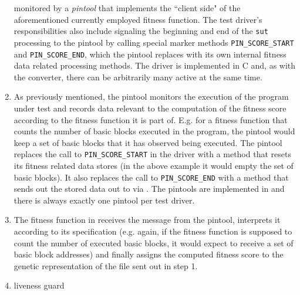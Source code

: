 \begin{enumerate}
  monitored by a \emph{pintool} that implements the ``client side" of the aforementioned currently 
  employed fitness function. The test driver's responsibilities also include signaling the beginning and end 
  of the \texttt{sut} processing to the pintool by calling special marker methods \texttt{PIN\_SCORE\_START} and
  \texttt{PIN\_SCORE\_END}, which the pintool replaces with its own internal fitness data related processing methods. 
  The driver is implemented in {\small C} and, as with the converter, there can be arbitrarily many active at the same time.
  \item As previously mentioned, the pintool monitors the execution of the program under test and records
  data relevant to the computation of the fitness score according to the fitness function it is part of.
  E.g. for a fitness function that counts the number of basic blocks executed in the program, the pintool 
  would keep a set of basic blocks that it has observed being executed. The pintool replaces the call to 
  \texttt{PIN\_SCORE\_START} in the driver with a method that resets its fitness related data stores (in the 
  above example it would empty the set of basic blocks). It also replaces the call to \texttt{PIN\_SCORE\_END} 
  with a method that sends out the stored data out to \xmlmate via \zmq. The pintools are implemented in \cpp 
  and there is always exactly one pintool per test driver.
  \item The fitness function in \xmlmate receives the message from the pintool, interprets it according to 
  its specification (e.g. again, if the fitness function is supposed to count the number of executed basic blocks, 
  it would expect to receive a set of basic block addresses) and finally assigns the computed fitness score to 
  the genetic representation of the \xml file sent out in step 1.
  \item liveness guard 
\end{enumerate}

